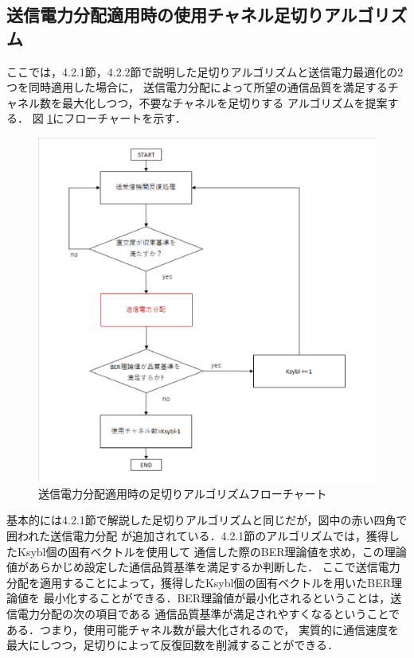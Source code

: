 \subsection{送信電力分配適用時の使用チャネル足切りアルゴリズム}
ここでは，4.2.1節，4.2.2節で説明した足切りアルゴリズムと送信電力最適化の2つを同時適用した場合に，
送信電力分配によって所望の通信品質を満足するチャネル数を最大化しつつ，不要なチャネルを足切りする
アルゴリズムを提案する．
図 \ref{figCombFlow}にフローチャートを示す．
\begin{figure}
    \centering
    \includegraphics[width=0.95\linewidth]{chapter4/figure/CombFlow.eps}
    \caption{送信電力分配適用時の足切りアルゴリズムフローチャート}
    \label{figCombFlow}
\end{figure}
基本的には4.2.1節で解説した足切りアルゴリズムと同じだが，図中の赤い四角で囲われた送信電力分配
が追加されている．4.2.1節のアルゴリズムでは，獲得したKsybl個の固有ベクトルを使用して
通信した際のBER理論値を求め，この理論値があらかじめ設定した通信品質基準を満足するか判断した．
ここで送信電力分配を適用することによって，獲得したKsybl個の固有ベクトルを用いたBER理論値を
最小化することができる．BER理論値が最小化されるということは，送信電力分配の次の項目である
通信品質基準が満足されやすくなるということである．つまり，使用可能チャネル数が最大化されるので，
実質的に通信速度を最大にしつつ，足切りによって反復回数を削減することができる．

